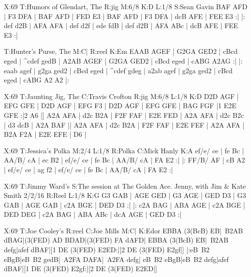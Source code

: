 \documentclass[letterpaper]{article}
\begin{document}
\begin{abc}[name]
X:69
T:Humors of Glendart, The
R:jig
M:6/8
K:D
L:1/8
S:Sean Gavin
BAF AFD | F3 DFA | BAF AFD | FED E3 |
BAF AFD | F3 DFA | dcB AFE | FEE E3 :|
|: def d2B | AFA AFA | def d2f | ede fdB |
def d2B | AFA ABc | dcB AFE | FEE E3 :|

T:Hunter's Purse, The
M:C|
R:reel
K:Em
EAAB AGEF | G2GA GED2 | cBcd eged | ^cdef gedB |
A2AB AGEF | G2GA GED2 | cBcd eged | cABG A2AG :|
|: eaab agef | g2ga ged2 | cBcd eged | ^cdef gdeg | 
a2ab agef | g2ga ged2 | cBcd eged | cABG A2 A2 |:
\end{abc}

\begin{abc}[name]
X:69
T:Jaunting Jig, The
C:Travis Crofton
R:jig
M:6/8
L:1/8
K:D
D2D AGF | EFG GFE | D2D AGF | EFG F3 |
D2D AGF | EFG GFE | BAG FGF |1 E2E GFE :|2 A6 |]
A2A AFA | d2c B2A | F2F FAF | E2E FED |
A2A AFA | d2c B2c | d3 dcB | A2A BAF ||
A2A AFA | d2c B2A | F2F FAF | E2E FEF |
A2A AFA | B2A F2A | E2E EFE | D6 |
\end{abc}

\begin{abc}[name]
X:69
T:Jessica's Polka
M:2/4
L:1/8
R:Polka
C:Mick Hanly
K:A
ef/e/ ce | fe Bc | AA/B/ cA | ec B2 |
ef/e/ ce | fe Bc | AA/B/ cA | FA E2 :|
|: FF/B/ AF | cB A2 | ef/e/ ce | ag f2 |
ef/e/ ce | fe Bc | AA/B/ cA | FA E2 :|
\end{abc}

\begin{abc}[name]
X:69
T:Jimmy Ward's
S:The session at The Golden Ace. Jenny, with Jim & Kate Smith 2/2/16
R:Reel
L:1/8
K:G
G3 GAB | AGE GED | G3 AGE | GED D3 |
G3 GAB | AGE GAB | c2A BGE | DED D3 :|
|: c2A BAG | ABA AGE | c2A BGE | DED DEG |
c2A BAG | ABA ABc | dcA AGE | GED D3 :|
\end{abc}

\begin{abc}[name]
X:69
T:Joe Cooley's
R:reel
C:Joe Mills
M:C|
K:Edor
EBBA (3(BcB) EB|~B2AB dBAG|(3(FED) AD BDAD|(3(FED) FA dAFD|
EBBA (3(BcB) EB|~B2AB defg|afef dBAF|[1 DE (3(FED) E2ED:|[2 DE (3(FED) E2gf|]
|:eB~B2 eBgB|eB~B2 gedB|~A2FA DAFA|~A2FA defg|
eB~B2 eBgB|eB~B2 defg|afef dBAF|[1 DE (3(FED) E2gf:|[2 DE (3(FED) E2ED|]
\end{abc}
\end{document}
